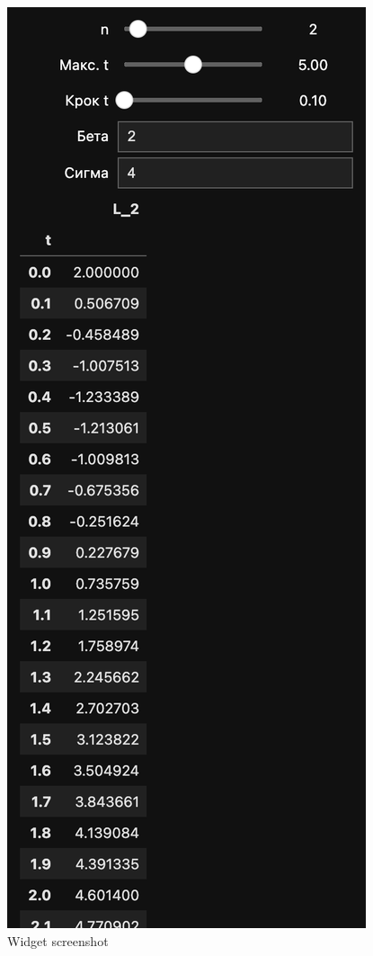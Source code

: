 \documentclass[11pt]{article}
\begin{document}
    \begin{figure}
\centering
\includegraphics{screenshots/2.png}
\caption{Widget screenshot}
\end{figure}
\newpage
\end{document}
